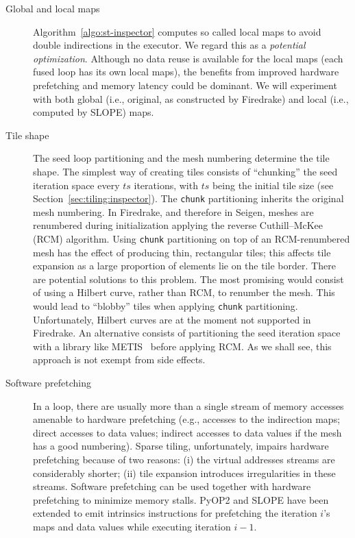 \begin{description}
\item[Global and local maps] Algorithm~\ref{algo:st-inspector} computes so called local maps to avoid double indirections in the executor. We regard this as a {\it potential optimization}. Although no data reuse is available for the local maps (each fused loop has its own local maps), the benefits from improved hardware prefetching and memory latency could be dominant. We will experiment with both global (i.e., original, as constructed by Firedrake) and local (i.e., computed by SLOPE) maps. 

\item[Tile shape] The seed loop partitioning and the mesh numbering determine the tile shape. The simplest way of creating tiles consists of ``chunking'' the seed iteration space every $ts$ iterations, with $ts$ being the initial tile size (see Section~\ref{sec:tiling:inspector}). The {\tt chunk} partitioning inherits the original mesh numbering. In Firedrake, and therefore in Seigen, meshes are renumbered during initialization applying the reverse Cuthill–McKee (RCM) algorithm. Using {\tt chunk} partitioning on top of an RCM-renumbered mesh has the effect of producing thin, rectangular tiles; this affects tile expansion as a large proportion of elements lie on the tile border. There are potential solutions to this problem. The most promising would consist of using a Hilbert curve, rather than RCM, to renumber the mesh. This would lead to ``blobby'' tiles when applying {\tt chunk} partitioning. Unfortunately, Hilbert curves are at the moment not supported in Firedrake. An alternative consists of partitioning the seed iteration space with a library like METIS~\citep{METIS} before applying RCM. As we shall see, this approach is not exempt from side effects.

\item[Software prefetching] In a loop, there are usually more than a single stream of memory accesses amenable to hardware prefetching (e.g., accesses to the indirection maps; direct accesses to data values; indirect accesses to data values if the mesh has a good numbering). Sparse tiling, unfortunately, impairs hardware prefetching because of two reasons: (i) the virtual addresses streams are considerably shorter; (ii) tile expansion introduces irregularities in these streams. Software prefetching can be used together with hardware prefetching to minimize memory stalls. PyOP2 and SLOPE have been extended to emit intrinsics instructions for prefetching the iteration $i$'s maps and data values while executing iteration $i-1$. 


\end{description}
